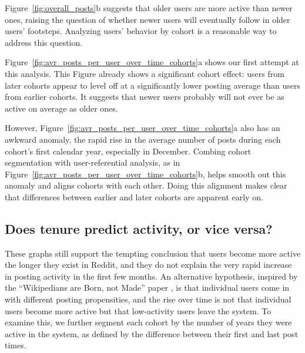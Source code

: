 \begin{figure*}[!tb]
\centering
{}
\caption{Figure (a) shows the average number of posts per active users over clock time and Figure (b) the active users in the user-time referential, both segmented by users' cohorts. The user cohort is defined by the year of the user's creation time.  For comparison, the black lines represent the overall averages from Figure~\ref{fig:overall_posts}.}
\label{fig:avr_posts_per_user_over_time_cohorts}
\end{figure*}

Figure~\ref{fig:overall_posts}b suggests that older users are more active than newer ones, raising the question of whether newer users
will eventually follow in older users' footsteps.  Analyzing users' behavior by cohort is a reasonable way to address this question.  

Figure~\ref{fig:avr_posts_per_user_over_time_cohorts}a shows our first attempt at this analysis.  This Figure already shows a significant cohort effect: users from later cohorts appear to level off at a significantly lower posting average than users from earlier cohorts.  It suggests that newer users probably will not ever be as active on average as older ones.

However, Figure~\ref{fig:avr_posts_per_user_over_time_cohorts}a also has an awkward anomaly, the rapid rise in the average number of posts during each cohort's first calendar year, especially in December.  
Combing cohort segmentation with user-referential analysis, as in Figure~\ref{fig:avr_posts_per_user_over_time_cohorts}b, helps smooth out this anomaly and aligns cohorts with each other.  Doing this alignment makes clear that differences between earlier and later cohorts are apparent early on.

\subsection{Does tenure predict activity, or vice versa?}

These graphs still support the tempting conclusion that users become more active the longer they exist in Reddit, and they do not explain the very rapid increase in posting activity in the first few months.  An alternative hypothesis, inspired by the ``Wikipedians are Born, not Made'' paper \cite{Panciera2009}, is that individual users come in with different posting propensities, and the rise over time is not that individual users become more active but that low-activity users leave the system.  To examine this, we further segment each cohort by the number of years they were active in the system, as defined by the difference between their first and last post times.
 
